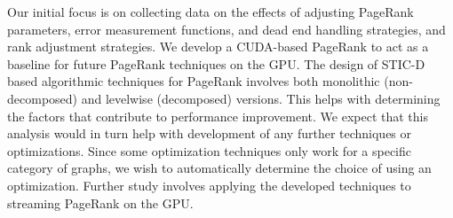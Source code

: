 Our initial focus is on collecting data on the effects of adjusting PageRank parameters, error measurement functions, and dead end handling strategies, and rank adjustment strategies. We develop a CUDA-based PageRank to act as a baseline for future PageRank techniques on the GPU.
The design of STIC-D based algorithmic techniques for PageRank \cite{pr-sticd16} involves both monolithic (non-decomposed) and levelwise (decomposed) versions. This helps with determining the factors that contribute to performance improvement. We expect that this analysis would in turn help with development of any further techniques or optimizations. Since some optimization techniques only work for a specific category of graphs, we wish to automatically determine the choice of using an optimization. Further study involves applying the developed techniques to streaming PageRank on the GPU.






